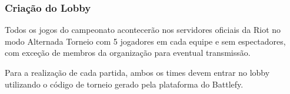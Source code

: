 \subsubsection{Criação do Lobby}

Todos os jogos do campeonato acontecerão nos servidores oficiais da Riot no modo Alternada Torneio com 5 jogadores em cada equipe e sem espectadores, com exceção de membros da organização para eventual transmissão.

Para a realização de cada partida, ambos os times devem entrar no lobby utilizando o código de torneio gerado pela plataforma do Battlefy.
